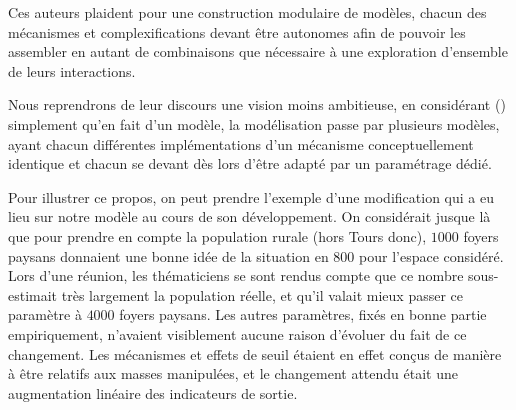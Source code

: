 Ces auteurs plaident pour une construction modulaire de modèles, chacun des mécanismes et complexifications devant être autonomes afin de pouvoir les assembler en autant de combinaisons que nécessaire à une exploration d'ensemble de leurs interactions.

Nous reprendrons de leur discours une vision moins ambitieuse, en considérant () simplement qu'en fait d'un modèle, la modélisation passe par plusieurs modèles, ayant chacun différentes implémentations d'un mécanisme conceptuellement identique et chacun se devant dès lors d'être adapté par un paramétrage dédié.

Pour illustrer ce propos, on peut prendre l'exemple d'une modification qui a eu lieu sur notre modèle au cours de son développement.
On considérait jusque là que pour prendre en compte la population rurale (hors Tours donc), $1000$ foyers paysans donnaient une bonne idée de la situation en 800 pour l'espace considéré.
Lors d'une réunion, les thématiciens se sont rendus compte que ce nombre sous-estimait très largement la population réelle, et qu'il valait mieux passer ce paramètre à $4000$ foyers paysans.
Les autres paramètres, fixés en bonne partie empiriquement, n'avaient visiblement aucune raison d'évoluer du fait de ce changement.
Les mécanismes  et effets de seuil étaient en effet conçus de manière à être relatifs aux masses manipulées, et le changement attendu était une augmentation linéaire des indicateurs de sortie.

